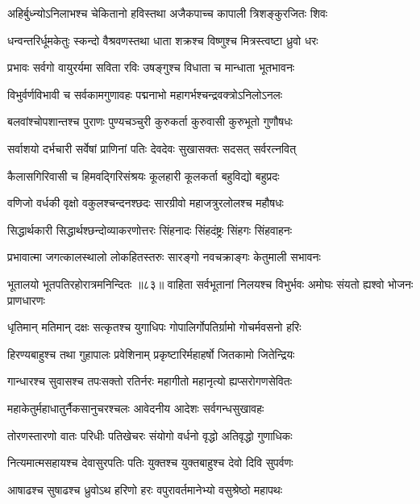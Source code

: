 \twolineshloka
{अहिर्बुध्न्योऽनिलाभश्च चेकितानो हविस्तथा}%
{अजैकपाच्च कापाली त्रिशङ्कुरजितः शिवः}%

\twolineshloka
{धन्वन्तरिर्धूमकेतुः स्कन्दो वैश्रवणस्तथा}%
{धाता शक्रश्च विष्णुश्च मित्रस्त्वष्टा ध्रुवो धरः}%

\twolineshloka
{प्रभावः सर्वगो वायुरर्यमा सविता रविः}%
{उषङ्गुश्च विधाता च मान्धाता भूतभावनः}%

\twolineshloka
{विभुर्वर्णविभावी च सर्वकामगुणावहः}%
{पद्मनाभो महागर्भश्चन्द्रवक्त्रोऽनिलोऽनलः}%

\twolineshloka
{बलवांश्चोपशान्तश्च पुराणः पुण्यचञ्चुरी}%
{कुरुकर्ता कुरुवासी कुरुभूतो गुणौषधः}%

\twolineshloka
{सर्वाशयो दर्भचारी सर्वेषां प्राणिनां पतिः}%
{देवदेवः सुखासक्तः सदसत् सर्वरत्नवित्}%

\twolineshloka
{कैलासगिरिवासी च हिमवद्गिरिसंश्रयः}%
{कूलहारी कूलकर्ता बहुविद्यो बहुप्रदः}%

\twolineshloka
{वणिजो वर्धकी वृक्षो वकुलश्चन्दनश्छदः}%
{सारग्रीवो महाजत्रुरलोलश्च महौषधः}%

\twolineshloka
{सिद्धार्थकारी सिद्धार्थश्छन्दोव्याकरणोत्तरः}%
{सिंहनादः सिंहदंष्ट्रः सिंहगः सिंहवाहनः}%

\twolineshloka
{प्रभावात्मा जगत्कालस्थालो लोकहितस्तरुः}%
{सारङ्गो नवचक्राङ्गः केतुमाली सभावनः}%

भूतालयो भूतपतिरहोरात्रमनिन्दितः ॥८३॥
\twolineshloka
{वाहिता सर्वभूतानां निलयश्च विभुर्भवः}%
{अमोघः संयतो ह्यश्वो भोजनः प्राणधारणः}%

\twolineshloka
{धृतिमान् मतिमान् दक्षः सत्कृतश्च युगाधिपः}%
{गोपालिर्गोपतिर्ग्रामो गोचर्मवसनो हरिः}%

\twolineshloka
{हिरण्यबाहुश्च तथा गुहापालः प्रवेशिनाम्}%
{प्रकृष्टारिर्महाहर्षो जितकामो जितेन्द्रियः}%

\twolineshloka
{गान्धारश्च सुवासश्च तपःसक्तो रतिर्नरः}%
{महागीतो महानृत्यो ह्यप्सरोगणसेवितः}%

\twolineshloka
{महाकेतुर्महाधातुर्नैकसानुचरश्चलः}%
{आवेदनीय आदेशः सर्वगन्धसुखावहः}%

\twolineshloka
{तोरणस्तारणो वातः परिधीः पतिखेचरः}%
{संयोगो वर्धनो वृद्धो अतिवृद्धो गुणाधिकः}%

\twolineshloka
{नित्यमात्मसहायश्च देवासुरपतिः पतिः}%
{युक्तश्च युक्तबाहुश्च देवो दिवि सुपर्वणः}%

\twolineshloka
{आषाढश्च सुषाढश्च ध्रुवोऽथ हरिणो हरः}%
{वपुरावर्तमानेभ्यो वसुश्रेष्ठो महापथः}%

